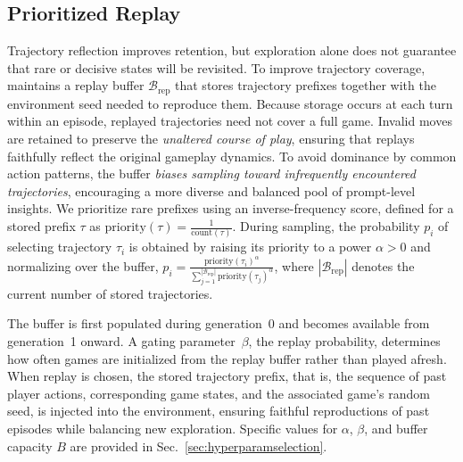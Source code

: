 \subsection{Prioritized Replay}
\label{sec:replay}
Trajectory reflection improves retention, but exploration alone does not guarantee that rare or decisive states will be revisited. To improve trajectory coverage, \NAME{} maintains a replay buffer $\mathcal{B}_{\text{rep}}$ that stores trajectory prefixes together with the environment seed needed to reproduce them. Because storage occurs at each turn within an episode, replayed trajectories need not cover a full game. Invalid moves are retained to preserve the \textit{unaltered course of play}, ensuring that replays faithfully reflect the original gameplay dynamics. To avoid dominance by common action patterns, the buffer \textit{biases sampling toward infrequently encountered trajectories}, encouraging a more diverse and balanced pool of prompt-level insights. We prioritize rare prefixes using an inverse-frequency score, defined for a stored prefix $\tau$ as $\mathrm{priority}(\tau)=\tfrac{1}{\mathrm{count}(\tau)}$. During sampling, the probability $p_i$ of selecting trajectory $\tau_i$ is obtained by raising its priority to a power $\alpha>0$ and normalizing over the buffer,
$p_i = \tfrac{\mathrm{priority}(\tau_i)^{\alpha}}
            {\sum_{j=1}^{|\mathcal{B}_{\text{rep}}|}
             \mathrm{priority}(\tau_j)^{\alpha}}$,
where $|\mathcal{B}_{\text{rep}}|$ denotes the current number of stored trajectories.

The buffer is first populated during generation~0 and becomes available from generation~1 onward.
A gating parameter~$\beta$, the replay probability, determines how often games are initialized from the replay buffer rather than played afresh. 
When replay is chosen, the stored trajectory prefix, that is, the sequence of past player actions, corresponding game states, and the associated game's random seed, is injected into the environment, ensuring faithful reproductions of past episodes while balancing new exploration. Specific values for $\alpha$, $\beta$, and buffer capacity $B$ are provided in Sec.~\ref{sec:hyperparamselection}.


